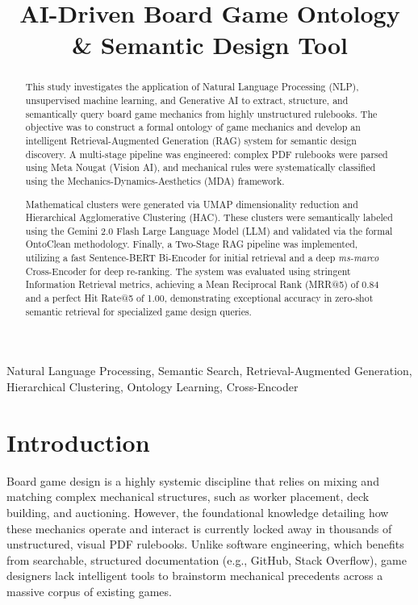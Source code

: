 \documentclass{article}
\title{AI-Driven Board Game Ontology \& Semantic Design Tool}
\begin{document}
\ninept
\maketitle

\begin{abstract}
This study investigates the application of Natural Language Processing (NLP), unsupervised machine learning, and Generative AI to extract, structure, and semantically query board game mechanics from highly unstructured rulebooks. The objective was to construct a formal ontology of game mechanics and develop an intelligent Retrieval-Augmented Generation (RAG) system for semantic design discovery. A multi-stage pipeline was engineered: complex PDF rulebooks were parsed using Meta Nougat (Vision AI), and mechanical rules were systematically classified using the Mechanics-Dynamics-Aesthetics (MDA) framework. 

Mathematical clusters were generated via UMAP dimensionality reduction and Hierarchical Agglomerative Clustering (HAC). These clusters were semantically labeled using the Gemini 2.0 Flash Large Language Model (LLM) and validated via the formal OntoClean methodology. Finally, a Two-Stage RAG pipeline was implemented, utilizing a fast Sentence-BERT Bi-Encoder for initial retrieval and a deep \emph{ms-marco} Cross-Encoder for deep re-ranking. The system was evaluated using stringent Information Retrieval metrics, achieving a Mean Reciprocal Rank (MRR@5) of 0.84 and a perfect Hit Rate@5 of 1.00, demonstrating exceptional accuracy in zero-shot semantic retrieval for specialized game design queries.
\end{abstract}

\begin{keywords}
Natural Language Processing, Semantic Search, Retrieval-Augmented Generation, Hierarchical Clustering, Ontology Learning, Cross-Encoder
\end{keywords}

\section{Introduction}
\label{sec:intro}
Board game design is a highly systemic discipline that relies on mixing and matching complex mechanical structures, such as worker placement, deck building, and auctioning. However, the foundational knowledge detailing how these mechanics operate and interact is currently locked away in thousands of unstructured, visual PDF rulebooks. Unlike software engineering, which benefits from searchable, structured documentation (e.g., GitHub, Stack Overflow), game designers lack intelligent tools to brainstorm mechanical precedents across a massive corpus of existing games.
 
\end{document}
